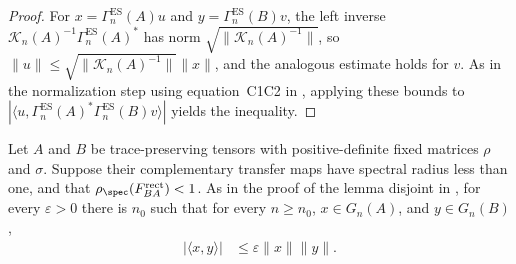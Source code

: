 \begin{proof}
    \leanok
    For $x=\Gamma_n^{\mathrm{ES}}(A)u$ and $y=\Gamma_n^{\mathrm{ES}}(B)v$, the left inverse
    $\mathcal K_n(A)^{-1}\Gamma_n^{\mathrm{ES}}(A)^*$ has norm
    $\sqrt{\lVert \mathcal K_n(A)^{-1}\rVert}$, so
    $\lVert u\rVert\leq\sqrt{\lVert \mathcal K_n(A)^{-1}\rVert}\lVert x\rVert$,
    and the analogous estimate holds for $v$. As in the normalization step using
    equation~\textup{C1C2} in \cite{Nachtergaele1996Spectral}, applying these
    bounds to $|\langle u,\Gamma_n^{\mathrm{ES}}(A)^*\Gamma_n^{\mathrm{ES}}(B)v\rangle|$
    yields the inequality.
\end{proof}

\begin{lemma}
    \label{thm:block_ground_space_overlap_decay}
    \leanok
    Let $A$ and $B$ be trace-preserving tensors with positive-definite
    fixed matrices $\rho$ and $\sigma$. Suppose their complementary
    transfer maps have spectral radius less than one, and that
    $\rho_{\spec}(F_{BA}^{\mathrm{rect}})<1$.
    As in the proof of the lemma \textup{disjoint} in
    \cite{Nachtergaele1996Spectral}, for every $\varepsilon>0$ there is $n_0$
    such that for every $n\geq n_0$, $x\in G_n(A)$, and $y\in G_n(B)$,
    \begin{align}
        |\langle x,y\rangle| & \leq\varepsilon\lVert x\rVert\lVert y\rVert.
    \end{align}
\end{lemma}

